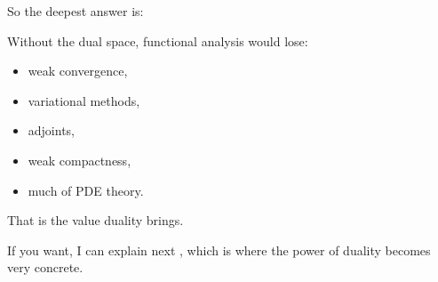 \documentclass[12pt,a4paper]{report}
\begin{document}
\begin{description}
So the deepest answer is:

\> 

Without the dual space, functional analysis would lose:

	\begin{itemize}
    \item weak convergence,
    \item variational methods,
    \item adjoints,
    \item weak compactness,
    \item much of PDE theory.
	\end{itemize}

That is the value duality brings.

\end{description}

If you want, I can explain next , which is where the power of duality becomes very concrete.
\end{document}
